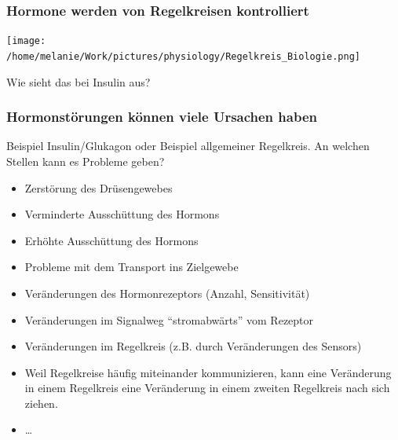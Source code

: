 \documentclass{beamer}
\begin{document}
\begin{frame}
\frametitle{Hormone werden von Regelkreisen kontrolliert}

\begin{center}
\texttt{[image: /home/melanie/Work/pictures/physiology/Regelkreis\_Biologie.png]}
\end{center}

\pause

\textcolor{theme}{Wie sieht das bei Insulin aus?}


\end{frame}


\begin{frame}
\frametitle{Hormonstörungen können viele Ursachen haben}

Beispiel Insulin/Glukagon oder Beispiel allgemeiner Regelkreis. An welchen Stellen kann es Probleme geben?

\pause

\begin{itemize}
\item
Zerstörung des Drüsengewebes
\item
Verminderte Ausschüttung des Hormons
\item
Erhöhte Ausschüttung des Hormons
\item
Probleme mit dem Transport ins Zielgewebe
\item
Veränderungen des Hormonrezeptors (Anzahl, Sensitivität)
\item
Veränderungen im Signalweg ``stromabwärts'' vom Rezeptor
\item
Veränderungen im Regelkreis (z.B. durch Veränderungen des Sensors)
\item
Weil Regelkreise häufig miteinander kommunizieren, kann eine Veränderung in einem Regelkreis eine Veränderung in einem zweiten Regelkreis nach sich ziehen.
\item
\dots

\end{itemize}

\end{frame}
\end{document}
